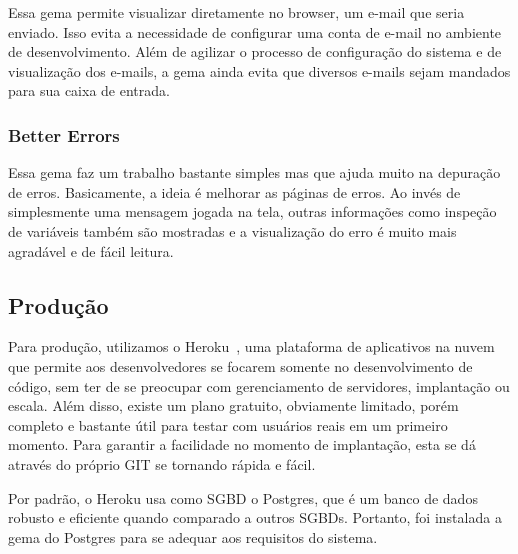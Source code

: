 Essa gema permite visualizar diretamente no browser, um e-mail que seria enviado. Isso evita a necessidade de configurar uma conta de e-mail no ambiente de desenvolvimento. Além de agilizar o processo de configuração do sistema e de visualização dos e-mails, a gema ainda evita que diversos e-mails sejam mandados para sua caixa de entrada.

\subsubsection{Better Errors}

Essa gema faz um trabalho bastante simples mas que ajuda muito na depuração de erros. Basicamente, a ideia é melhorar as páginas de erros. Ao invés de simplesmente uma mensagem jogada na tela, outras informações como inspeção de variáveis também são mostradas e a visualização do erro é muito mais agradável e de fácil leitura.

\subsection{Produção}

Para produção, utilizamos o Heroku~\cite{heroku}, uma plataforma de aplicativos na nuvem que permite aos desenvolvedores se focarem somente no desenvolvimento de código, sem ter de se preocupar com gerenciamento de servidores, implantação ou escala. Além disso, existe um plano gratuito, obviamente limitado, porém completo e bastante útil para testar com usuários reais em um primeiro momento. Para garantir a facilidade no momento de implantação, esta se dá através do próprio GIT se tornando rápida e fácil.

Por padrão, o Heroku usa como SGBD o Postgres, que é um banco de dados robusto e eficiente quando comparado a outros SGBDs. Portanto, foi instalada a gema do Postgres para se adequar aos requisitos do sistema.
